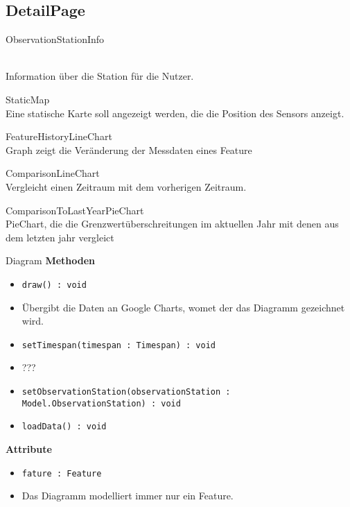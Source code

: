 \subsection{DetailPage}

   
    \begin{Class}{ObservationStationInfo}
      
            \\ Information über die Station für die Nutzer.
    \end{Class}

    \begin{Class}{StaticMap}
            \\Eine statische Karte soll angezeigt werden, die die Position des Sensors anzeigt.
    \end{Class}

  
    \begin{Class}{FeatureHistoryLineChart}
           \\ Graph zeigt die Veränderung der Messdaten eines Feature
    \end{Class}

    \begin{Class}{ComparisonLineChart}
            \\Vergleicht einen Zeitraum mit dem vorherigen Zeitraum.
    \end{Class}

    \begin{Class}{ComparisonToLastYearPieChart}
            \\ PieChart, die die Grenzwertüberschreitungen im aktuellen Jahr mit denen aus dem letzten jahr vergleict 
    \end{Class}

    \begin{Class}{Diagram}
        \textbf{Methoden}
        \begin{itemize}
            \item \texttt{draw() : void}
            \item Übergibt die Daten an Google Charts, womet der das Diagramm gezeichnet wird.
            \item \texttt{setTimespan(timespan : Timespan) : void} 
            \item ??? 
            \item \texttt{setObservationStation(observationStation : Model.ObservationStation) : void}
            \item \texttt{loadData() : void}
        \end{itemize}
        
        \textbf{Attribute}
        \begin{itemize}
            \item \texttt{fature : Feature}
            \item Das Diagramm modelliert immer nur ein Feature.
        \end{itemize}
    \end{Class}

